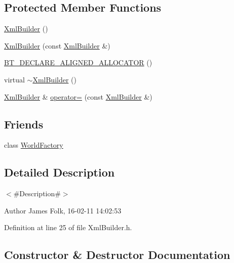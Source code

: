 \subsection*{Protected Member Functions}
\begin{DoxyCompactItemize}
\item 
\mbox{\hyperlink{classnjli_1_1_xml_builder_aa62b57286a7d073acc7e14c92fd976e6}{Xml\+Builder}} ()
\item 
\mbox{\hyperlink{classnjli_1_1_xml_builder_a94c70f4b615a9665c1ee0311b1e1f107}{Xml\+Builder}} (const \mbox{\hyperlink{classnjli_1_1_xml_builder}{Xml\+Builder}} \&)
\item 
\mbox{\hyperlink{classnjli_1_1_xml_builder_ab4670b7871d43bdbbd5e1c63f8d54b58}{B\+T\+\_\+\+D\+E\+C\+L\+A\+R\+E\+\_\+\+A\+L\+I\+G\+N\+E\+D\+\_\+\+A\+L\+L\+O\+C\+A\+T\+OR}} ()
\item 
virtual \mbox{\hyperlink{classnjli_1_1_xml_builder_a25ead09286e4f9b32867bdeb24b77665}{$\sim$\+Xml\+Builder}} ()
\item 
\mbox{\hyperlink{classnjli_1_1_xml_builder}{Xml\+Builder}} \& \mbox{\hyperlink{classnjli_1_1_xml_builder_aced0185f989f50ba3dcfdea93818dcd2}{operator=}} (const \mbox{\hyperlink{classnjli_1_1_xml_builder}{Xml\+Builder}} \&)
\end{DoxyCompactItemize}
\subsection*{Friends}
\begin{DoxyCompactItemize}
\item 
class \mbox{\hyperlink{classnjli_1_1_xml_builder_acb96ebb09abe8f2a37a915a842babfac}{World\+Factory}}
\end{DoxyCompactItemize}


\subsection{Detailed Description}
$<$\#\+Description\#$>$ 

\begin{DoxyAuthor}{Author}
James Folk, 16-\/02-\/11 14\+:02\+:53 
\end{DoxyAuthor}


Definition at line 25 of file Xml\+Builder.\+h.



\subsection{Constructor \& Destructor Documentation}
\mbox{\label{classnjli_1_1_xml_builder_aa62b57286a7d073acc7e14c92fd976e6}} 
